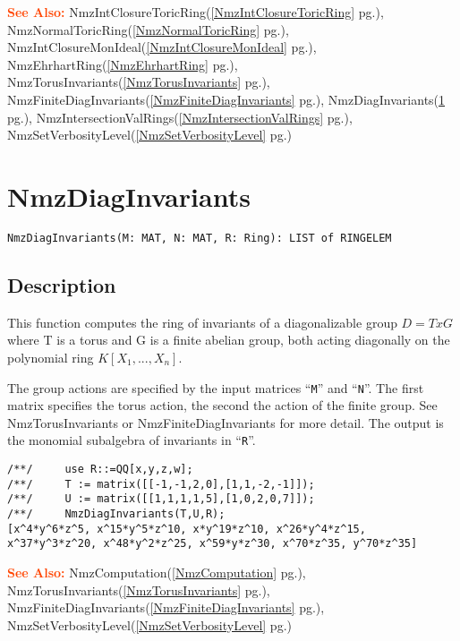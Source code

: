 \documentclass[a4paper]{mybook}
\newenvironment{command}{}{} %
\newcommand\SeeAlso{\par\textcolor{OrangeRed}{\textbf{\large See Also: }}}
\begin{document}
\begin{command}
\SeeAlso %
  NmzIntClosureToricRing(\ref{NmzIntClosureToricRing} pg.\pageref{NmzIntClosureToricRing}), 
    NmzNormalToricRing(\ref{NmzNormalToricRing} pg.\pageref{NmzNormalToricRing}), 
    NmzIntClosureMonIdeal(\ref{NmzIntClosureMonIdeal} pg.\pageref{NmzIntClosureMonIdeal}), 
    NmzEhrhartRing(\ref{NmzEhrhartRing} pg.\pageref{NmzEhrhartRing}), 
    NmzTorusInvariants(\ref{NmzTorusInvariants} pg.\pageref{NmzTorusInvariants}), 
    NmzFiniteDiagInvariants(\ref{NmzFiniteDiagInvariants} pg.\pageref{NmzFiniteDiagInvariants}), 
    NmzDiagInvariants(\ref{NmzDiagInvariants} pg.\pageref{NmzDiagInvariants}), 
    NmzIntersectionValRings(\ref{NmzIntersectionValRings} pg.\pageref{NmzIntersectionValRings}), 
    NmzSetVerbosityLevel(\ref{NmzSetVerbosityLevel} pg.\pageref{NmzSetVerbosityLevel})
\end{command} %

\section{NmzDiagInvariants}
\label{NmzDiagInvariants}
\begin{command} %


\begin{Verbatim}[label=syntax, rulecolor=\color{MidnightBlue},
frame=single]
NmzDiagInvariants(M: MAT, N: MAT, R: Ring): LIST of RINGELEM
\end{Verbatim}


\subsection*{Description}

This function computes the ring of invariants of a diagonalizable
group $D = T x G$ where T is a torus and G is a finite abelian
group, both acting diagonally on the polynomial
ring $K[X_1,...,X_n]$.
\par 
The group actions are specified by the input matrices ``\verb&M&'' and ``\verb&N&''. The
first matrix specifies the torus action, the second the action of the
finite group.  See NmzTorusInvariants or NmzFiniteDiagInvariants for more
detail.  The output is the monomial subalgebra of invariants in ``\verb&R&''.
\begin{Verbatim}[label=example, rulecolor=\color{PineGreen}, frame=single]
/**/     use R::=QQ[x,y,z,w];
/**/     T := matrix([[-1,-1,2,0],[1,1,-2,-1]]);
/**/     U := matrix([[1,1,1,1,5],[1,0,2,0,7]]);
/**/     NmzDiagInvariants(T,U,R);
[x^4*y^6*z^5, x^15*y^5*z^10, x*y^19*z^10, x^26*y^4*z^15, x^37*y^3*z^20, x^48*y^2*z^25, x^59*y*z^30, x^70*z^35, y^70*z^35]
\end{Verbatim}


\SeeAlso %
  NmzComputation(\ref{NmzComputation} pg.\pageref{NmzComputation}), 
    NmzTorusInvariants(\ref{NmzTorusInvariants} pg.\pageref{NmzTorusInvariants}), 
    NmzFiniteDiagInvariants(\ref{NmzFiniteDiagInvariants} pg.\pageref{NmzFiniteDiagInvariants}), 
    NmzSetVerbosityLevel(\ref{NmzSetVerbosityLevel} pg.\pageref{NmzSetVerbosityLevel})
\end{command} %
\end{document}
